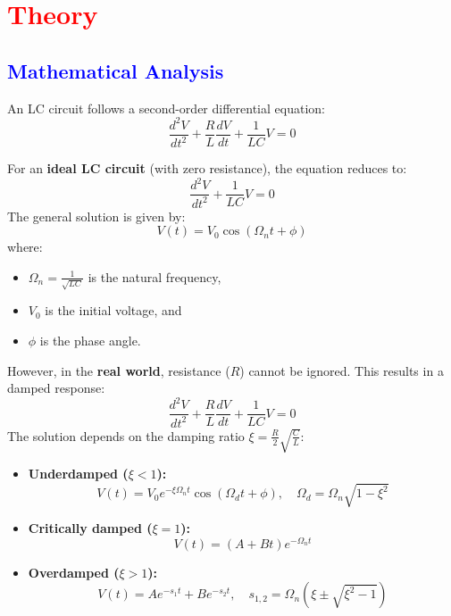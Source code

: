 \documentclass[a4paper,12pt]{article}
\begin{document}
\section{\textcolor{red}{Theory}}
\subsection{\textcolor{blue}{Mathematical Analysis}}
\begin{tcolorbox}[breakable , colframe=purple!70!black,colback=magenta!10!white]
An LC circuit follows a second-order differential equation:
\begin{equation}
\frac{d^2V}{dt^2} + \frac{R}{L} \frac{dV}{dt} + \frac{1}{LC} V = 0
\end{equation}

For an \textbf{ideal LC circuit} (with zero resistance), the equation reduces to:
\begin{equation}
\frac{d^2V}{dt^2} + \frac{1}{LC} V = 0
\end{equation}
The general solution is given by:
\begin{equation}
V(t) = V_0 \cos(\Omega_n t + \phi)
\end{equation}
where:
\begin{itemize}
\item $\Omega_n = \frac{1}{\sqrt{LC}}$ is the natural frequency,
\item $V_0$ is the initial voltage, and
\item $\phi$ is the phase angle.
\end{itemize}

However, in the \textbf{real world}, resistance ($R$) cannot be ignored. This results in a damped response:
\begin{equation}
\frac{d^2V}{dt^2} + \frac{R}{L} \frac{dV}{dt} + \frac{1}{LC} V = 0
\end{equation}
The solution depends on the damping ratio $\xi = \frac{R}{2} \sqrt{\frac{C}{L}}$:
\begin{itemize}
\item \textbf{Underdamped ($\xi < 1$):}
\begin{equation}
V(t) = V_0 e^{-\xi \Omega_n t} \cos(\Omega_d t + \phi), \quad \Omega_d = \Omega_n \sqrt{1 - \xi^2}
\end{equation}
\item \textbf{Critically damped ($\xi = 1$):}
\begin{equation}
V(t) = (A + Bt) e^{-\Omega_n t}
\end{equation}
\item \textbf{Overdamped ($\xi > 1$):}
\begin{equation}
V(t) = A e^{-s_1 t} + B e^{-s_2 t}, \quad s_{1,2} = \Omega_n (\xi \pm \sqrt{\xi^2 - 1})
\end{equation}
\end{itemize}
\end{tcolorbox}
\end{document}
